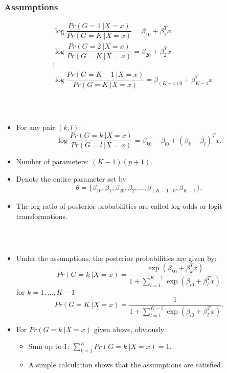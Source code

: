 \documentclass[12pt,notes,mathserif]{beamer}
\begin{document}
\begin{frame}[c]
	\frametitle{Assumptions}
	\begin{gather*}
		\log \dfrac{Pr(G=1~|X=x)}{Pr(G=K~|X=x)}=\beta_{10}+\beta_1^{T}x\\
		\log \dfrac{Pr(G=2~|X=x)}{Pr(G=K~|X=x)}=\beta_{20}+\beta_2^{T}x\\
		\vdots\\
		\log \dfrac{Pr(G=K-1~|X=x)}{Pr(G=K~|X=x)}=\beta_{(K-1)0}+\beta_{K-1}^{T}x
	\end{gather*}
\end{frame}

\begin{frame}[c]
	\frametitle{~}
	\begin{itemize}
		\item For any pair $(k,l)$:
		      \begin{equation*}
			      \log \dfrac{Pr(G=k~|X=x)}{Pr(G=l~|X=x)}=\beta_{k0}-\beta_{l0}+(\beta_{k}-\beta_{l})^{T}x.
		      \end{equation*}
		\item Number of parameters: $(K-1)(p+1)$.
		\item Denote the entire parameter set by
		      \begin{equation*}
			      \theta=\{
			      \beta_{10},
			      \beta_{1},
			      \beta_{20},
			      \beta_{2},
			      \ldots,
			      \beta_{(K-1)0},
			      \beta_{K-1}
			      \}.
		      \end{equation*}
		\item The log ratio of posterior probabilities are called log-odds or logit transformations.
	\end{itemize}
\end{frame}

\begin{frame}[c]
	\frametitle{~}
	\begin{itemize}
		\item Under the assumptions, the posterior probabilities are given by:
		      \begin{equation*}
			      Pr(G=k~|X=x)=\dfrac{\exp(\beta_{k0}+\beta_k^Tx)}{1+\sum_{l=1}^{K-1}\exp(\beta_{l0}+\beta_l^Tx)}
		      \end{equation*}
		      for $k=1,\ldots,K-1$
		      \begin{equation*}
			      Pr(G=K~|X=x)=\dfrac{1}{1+\sum_{l=1}^{K-1}\exp(\beta_{l0}+\beta_l^Tx)}.
		      \end{equation*}
		\item
		      For $Pr(G = k~| X = x)$ given above, obviously
		      \begin{itemize}
			      \item  Sum up to 1: $\sum\nolimits_{k=1}^{K}Pr(G=k~|X=x)=1$.
			      \item
			            A simple calculation shows that the assumptions are satisfied.
		      \end{itemize}
	\end{itemize}
\end{frame}
\end{document}
